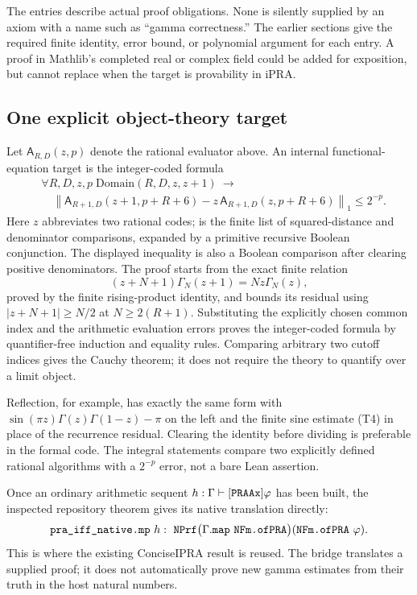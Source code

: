 The entries describe actual proof obligations. None is silently supplied
by an axiom with a name such as ``gamma correctness.'' The earlier
sections give the required finite identity, error bound, or polynomial
argument for each entry. A proof in Mathlib's completed real or complex
field could be added for exposition, but cannot replace
 when the target is provability in iPRA.

\subsection{One explicit object-theory target}

Let $\mathsf A_{R,D}(z,p)$ denote the rational evaluator above.
An internal functional-equation target is the integer-coded formula
\[
 \begin{aligned}
 &\forall R,D,z,p\;\mathrm{Domain}(R,D,z,z+1)\ \longrightarrow\\
 &\quad\left\|
 \mathsf A_{R+1,D}(z+1,p+R+6)
 -z\,\mathsf A_{R+1,D}(z,p+R+6)
 \right\|_1\le2^{-p}.
 \end{aligned}
\]
Here $z$ abbreviates two rational codes;  is the finite
list of squared-distance and denominator comparisons, expanded by a
primitive recursive Boolean conjunction. The displayed inequality is
also a Boolean comparison after clearing positive denominators. The
proof starts from the exact finite relation
\[
 (z+N+1)\Gamma_N(z+1)=Nz\Gamma_N(z),
\]
proved by the finite rising-product identity, and bounds its residual
using $|z+N+1|\ge N/2$ at $N\ge2(R+1)$. Substituting the explicitly
chosen common index and the arithmetic evaluation errors proves the
integer-coded formula by quantifier-free induction and equality rules.
Comparing arbitrary two cutoff indices gives the Cauchy theorem; it
does not require the theory to quantify over a limit object.

Reflection, for example, has exactly the same form with
$\sin(\pi z)\Gamma(z)\Gamma(1-z)-\pi$ on the left and the finite
sine estimate (T4) in place of the recurrence residual. Clearing the
identity before dividing is preferable in the formal code. The integral
statements compare two explicitly defined rational algorithms with a
$2^{-p}$ error, not a bare Lean  assertion.

Once an ordinary arithmetic sequent $h:\Gamma\vdash[\texttt{PRAAx}]\varphi$
has been built, the inspected repository theorem gives its native
translation directly:
\[
 \texttt{pra\_iff\_native.mp}\ h
 :\ \texttt{NPrf}\bigl(\Gamma.\texttt{map}\ \texttt{NFm.ofPRA}\bigr)
                    (\texttt{NFm.ofPRA}\ \varphi).
\]
This is where the existing ConciseIPRA result is reused. The bridge
translates a supplied proof; it does not automatically prove new gamma
estimates from their truth in the host natural numbers.

